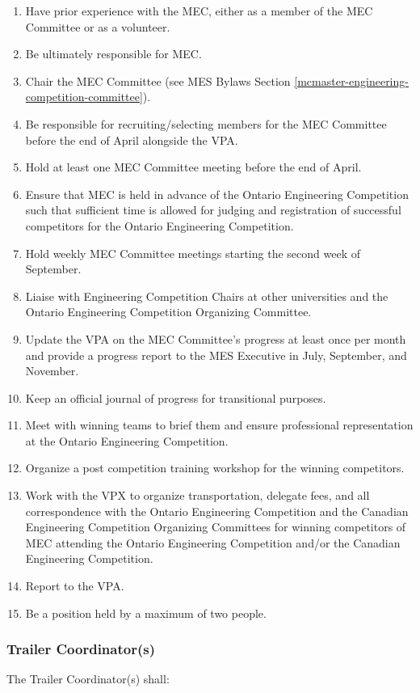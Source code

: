 \begin{enumerate}
 \item
  Have prior experience with the MEC, either as a member of the MEC Committee or as a volunteer.
 \item
  Be ultimately responsible for MEC.
 \item
  Chair the MEC Committee (see MES Bylaws Section \ref{mcmaster-engineering-competition-committee}).
 \item
  Be responsible for recruiting/selecting members for the MEC Committee before the end of April alongside the VPA.
 \item
  Hold at least one MEC Committee meeting before the end of April.
 \item
  Ensure that MEC is held in advance of the Ontario Engineering Competition such that sufficient time is allowed for judging and registration of successful competitors for the Ontario Engineering Competition.
 \item
  Hold weekly MEC Committee meetings starting the second week of September.
 \item
  Liaise with Engineering Competition Chairs at other universities and the Ontario Engineering Competition Organizing Committee.
 \item
  Update the VPA on the MEC Committee's progress at least once per month and provide a progress report to the MES Executive in July, September, and November.
 \item
  Keep an official journal of progress for transitional purposes.
 \item
  Meet with winning teams to brief them and ensure professional representation at the Ontario Engineering Competition.
 \item
  Organize a post competition training workshop for the winning competitors.
 \item
  Work with the VPX to organize transportation, delegate fees, and all correspondence with the Ontario Engineering Competition and the Canadian Engineering Competition Organizing Committees for winning competitors of MEC attending the Ontario Engineering Competition and/or the Canadian Engineering Competition.
 \item
  Report to the VPA.
 \item
  Be a position held by a maximum of two people.

\end{enumerate}

\subsubsection{Trailer Coordinator(s)}
\label{trailer-coordinators}
The Trailer Coordinator(s) shall:

